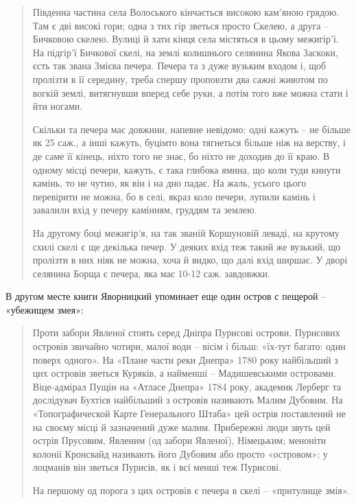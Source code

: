 \begin{quotation}
Південна частина села Волоського кінчається високою кам'яною грядою. Там є дві високі гори; одна з тих гір зветься просто Скелею, а друга – Бичковою скелею. Вулиці й хати кінця села містяться в цьому межигір'ї. На підгір'ї Бичкової скелі, на землі колишнього селянина Якова Заскоки, єсть так звана Змієва печера. Печера та з дуже вузьким входом і, щоб пролізти в її середину, треба спершу проповзти два сажні животом по вогкій землі, витягнувши вперед себе руки, а потім того вже можна стати і йти ногами.

Скільки та печера має довжини, напевне невідомо: одні кажуть – не більше як 25 саж., а інші кажуть, буцімто вона тягнеться більше ніж на верству, і де саме її кінець, ніхто того не знає, бо ніхто не доходив до її краю. В одному місці печери, кажуть, є така глибока ямина, що коли туди кинути камінь, то не чутно, як він і на дно падає. На жаль, усього цього перевірити не можна, бо в селі, якраз коло печери, лупили камінь і завалили вхід у печеру камінням, груддям та землею.

На другому боці межигір'я, на так званій Коршуновій леваді, на крутому схилі скелі є ще декілька печер. У деяких вхід теж такий же вузький, що пролізти в них ніяк не можна, хоча й видко, що далі вхід ширшає. У дворі селянина Борща є печера, яка має 10-12 саж. завдовжки.
\end{quotation}

В другом месте книги Яворницкий упоминает еще один остров с пещерой – «убежищем змея»:

\begin{quotation}
Проти забори Явленої стоять серед Дніпра Пурисові острови. Пурисових островів звичайно чотири, малої води – вісім і більш: «їх-тут багато: один поверх одного». На «Плане части реки Днепра» 1780 року найбільший з цих островів зветься Куряків, а найменші – Мадишевськими островами. Віце-адмірал Пущін на «Атласе Днепра» 1784 року, академик Лерберг та дослідувач Бухтієв найбільший з островів називають Малим Дубовим. На «Топографической Карте Генерального Штаба» цей острів поставлений не на своєму місці й зазначений дуже малим. Прибережні люди звуть цей острів Прусовим, Явленим (од забори Явленої), Німецьким; меноніти колонії Кронсвайд називають його Дубовим або просто «островом»; у лоцманів він зветься Пурисів, як і всі менші теж Пурисові.

На першому од порога з цих островів є печера в скелі – «притулище змія».
\end{quotation}


